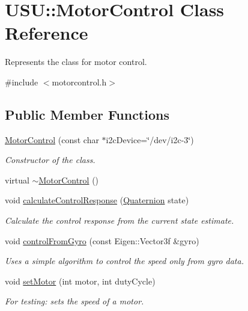 \hypertarget{class_u_s_u_1_1_motor_control}{\section{\-U\-S\-U\-:\-:\-Motor\-Control \-Class \-Reference}
\label{class_u_s_u_1_1_motor_control}
}


\-Represents the class for motor control.  




{\ttfamily \#include $<$motorcontrol.\-h$>$}

\subsection*{\-Public \-Member \-Functions}
\begin{DoxyCompactItemize}
\item 
\hyperlink{class_u_s_u_1_1_motor_control_a85b6eed3bdd71d61a690395156999888}{\-Motor\-Control} (const char $\ast$i2c\-Device=\char`\"{}/dev/i2c-\/3\char`\"{})
\begin{DoxyCompactList}\small\item\em \-Constructor of the class. \end{DoxyCompactList}\item 
virtual \hyperlink{class_u_s_u_1_1_motor_control_a5bc78d24ed52a012a3f81cd3b62216f3}{$\sim$\-Motor\-Control} ()
\item 
void \hyperlink{class_u_s_u_1_1_motor_control_a40b7e40ce5bfb7fb0dea6c0a75d1eb5e}{calculate\-Control\-Response} (\hyperlink{class_u_s_u_1_1_quaternion}{\-Quaternion} state)
\begin{DoxyCompactList}\small\item\em \-Calculate the control response from the current state estimate. \end{DoxyCompactList}\item 
void \hyperlink{class_u_s_u_1_1_motor_control_acd56c7bf602f8162edaa219e902b1937}{control\-From\-Gyro} (const \-Eigen\-::\-Vector3f \&gyro)
\begin{DoxyCompactList}\small\item\em \-Uses a simple algorithm to control the speed only from gyro data. \end{DoxyCompactList}\item 
void \hyperlink{class_u_s_u_1_1_motor_control_ad08369ed288a7816de1b3c423684f0da}{set\-Motor} (int motor, int duty\-Cycle)
\begin{DoxyCompactList}\small\item\em \-For testing\-: sets the speed of a motor. \end{DoxyCompactList}\item 

\end{DoxyCompactItemize}
